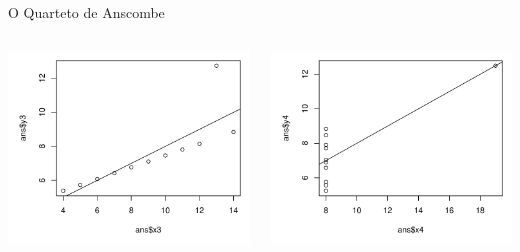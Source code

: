 \documentclass{beamer}\usepackage[]{graphicx}\usepackage[]{color}
\newenvironment{knitrout}{}{} %
\renewenvironment{knitrout}{\setlength{\topsep}{0mm}}{}
\begin{document}
\begin{frame}[fragile]{O Quarteto de Anscombe}
\begin{columns}[c]
\begin{knitrout}
\color{fgcolor}
\includegraphics[width=0.9\linewidth]{figure/an34-1} 

\includegraphics[width=0.9\linewidth]{figure/an34-2} 

\end{knitrout}

\end{columns}

\end{frame} 
\end{document}
